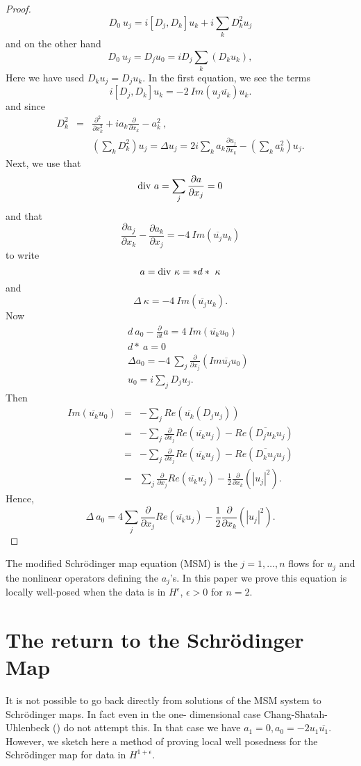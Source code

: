 \documentclass[draft,11pt,leqno]{amsart}
\newcommand{\ol}[1]{\overline{#1}}
\newcommand{\De}{\Delta}
\newcommand{\ka}{\kappa}
\newcommand{\suml}{\sum\limits}
\newcommand{\f}{\displaystyle\frac}
\newcommand{\p}{\partial}
\newcommand{\pp}[2]{\f{\p #1}{\p #2}}
\begin{document}
\begin{proof}
$$ D_0\ u_j = i[D_j,D_k]u_k+i \suml_k D_k^2 u_j $$
and on the other hand 
$$ D_0\ u_j = D_ju_0=i D_j\suml_k (D_k u_k),$$ 
Here we have used $D_ku_j=D_ju_k$. In the first equation, we see the terms 
$$ i[D_j,D_k]u_k=-2\ Im(u_j\overline{u_k})u_k.$$ and since
\begin{eqnarray*}
D_k^2 &=& \f{\p^2}{\p x_k^2}+i a_k \pp{}{x_k}-a_k^2\ , \\
& &\left(\suml_k D_k^2\right) u_j = \De u_j=2i \suml_k a_k\pp{u_j}{x_k}-
\left(\suml_k a_k^2\right)u_j.
\end{eqnarray*}
Next, we use that $$
\textup{div}\ a=\sum_{j}\pp{a}{x_j}=0
$$ and that $$ \pp{a_j}{x_k}-\pp{a_k}{x_j}=-4\ Im(\overline{u_j}u_k)$$ 
to write $$ a=\textup{div}\ \ka=*d*\ \ka $$ and
$$ \De\ \ka=-4\ Im(\overline{u_j}u_k). $$ Now 
\begin{eqnarray*}
& &d\ a_0-\pp{}{t} a=4\ Im(\overline{u_k}u_0)\\
& &d*\ a=0 \\
& &\De a_0=-4\ \suml_j \pp{}{x_j}(Im\overline{u_j}u_0)\\
& &u_0=i \suml_jD_ju_j.
\end{eqnarray*} Then
\begin{eqnarray*}
Im(\overline{u_k}u_0)&=&-\suml_j Re(\ol{u_k}(D_ju_j)) \\
&=&-\suml_j \pp{}{x_j}Re(\ol{u_k}u_j)-Re(\ol{D_ju_k} u_j) \\
&=& -\suml_j \pp{}{x_j}Re(\ol{u_k}u_j)-Re(\ol{D_ku_j} u_j)\\
&=& \suml_j \pp{}{x_j}Re(\ol{u_k}u_j)-\f{1}{2}\pp{}{x_k}(|u_j|^2).
\end{eqnarray*} Hence, $$ \De \ a_0=4\suml_j\pp{}{x_j}Re(\ol{u_k}u_j)-\f{1}{2}\pp{}{x_k}(|u_j|^2).$$ \end{proof}
The modified Schr\"odinger map equation (MSM) is the $j=1,\ldots,n$ flows
for $u_j$ and the nonlinear operators defining the $a_j$'s. In this paper
we prove this equation is locally well-posed when the data is in 
$H^{\epsilon}$, $\epsilon>0$ for $n=2$.

\vspace{.5cm}

\section { The return to the Schr\"odinger Map}

\vspace{.5cm}


It is not possible to go back directly from solutions of the MSM system 
to Schr\"odinger maps. In fact even in the one- dimensional case 
Chang-Shatah-Uhlenbeck (\cite{Chang})  do not attempt this. In that case we
have $a_1=0, a_0=-2u_1\ol{u_1}$. However, we sketch here a method of proving
local well posedness for the Schr\"odinger map for data in $H^{1+\epsilon}$. 
\end{document}
